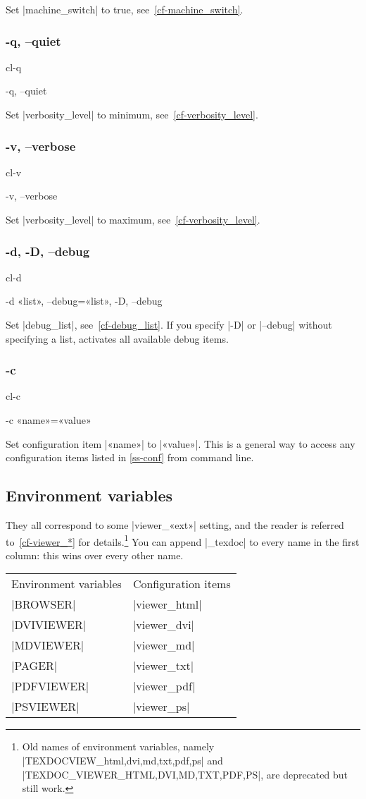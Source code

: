 \documentclass[a4paper, oneside]{scrartcl}
\newif\ifframed
\newenvironment{cmdsubsub}[2]{%
  \framedfalse \commandes\subsubsection{#1}{#2}%
  }{%
  \endcommandes}
\begin{document}
Set |machine_switch| to true, see~\ref{cf-machine_switch}.

\begin{cmdsubsub}{-q, --quiet}{cl-q}
  -q, --quiet
\end{cmdsubsub}

Set |verbosity_level| to minimum, see~\ref{cf-verbosity_level}.

\begin{cmdsubsub}{-v, --verbose}{cl-v}
  -v, --verbose
\end{cmdsubsub}

Set |verbosity_level| to maximum, see~\ref{cf-verbosity_level}.

\begin{cmdsubsub}{-d, -D, --debug}{cl-d}
  -d «list», --debug=«list», -D, --debug
\end{cmdsubsub}

Set |debug_list|, see~\ref{cf-debug_list}. If you specify |-D| or |--debug|
without specifying a list, activates all available debug items.

\begin{cmdsubsub}{-c}{cl-c}
  -c «name»=«value»
\end{cmdsubsub}

Set configuration item |«name»| to |«value»|. This is a general way to access
any configuration items listed in \ref{ss-conf} from command line.

\subsection{Environment variables}\label{ss-envvar}

They all correspond to some |viewer_«ext»| setting, and the reader is referred
to~\ref{cf-viewer_*} for details.\footnote{Old names of environment variables,
namely |TEXDOCVIEW_{html,dvi,md,txt,pdf,ps}| and
|TEXDOC_VIEWER_{HTML,DVI,MD,TXT,PDF,PS}|, are deprecated but still work.} You can
append |_texdoc| to every name in the first column: this wins over every other
name.

\begin{center}
\begin{tabular}{ll}
Environment variables & Configuration items \\
|BROWSER|             & |viewer_html|       \\
|DVIVIEWER|           & |viewer_dvi|        \\
|MDVIEWER|            & |viewer_md|         \\
|PAGER|               & |viewer_txt|        \\
|PDFVIEWER|           & |viewer_pdf|        \\
|PSVIEWER|            & |viewer_ps|         \\
\end{tabular}
\end{center}
\end{document}
